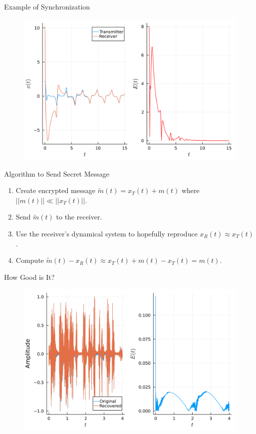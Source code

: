 \documentclass{beamer}
\begin{document}
\begin{frame}{Example of Synchronization}
    \begin{figure}[H]
        \includegraphics[width=\linewidth,height=\textheight,keepaspectratio]{combined_plot.png}
        \centering
    \end{figure}
\end{frame}


\begin{frame}{Algorithm to Send Secret Message}
    \begin{enumerate}[<+->]
        \item Create encrypted message $\widetilde{m}(t) = x_T (t) + m(t)$ where $||m(t)|| \ll ||x_T(t)||$. 
        \item Send $\widetilde{m}(t)$ to the receiver. 
        \item Use the receiver's dynamical system to hopefully reproduce $x_R(t) \approx x_T(t)$. 
        \item Compute $\widetilde{m}(t) - x_R(t) \approx x_T (t) + m(t) - x_T(t) = m(t)$. 
    \end{enumerate}
\end{frame}

\begin{frame}{How Good is It?}
    \begin{figure}[H]
        \includegraphics[width=\linewidth,height=\textheight,keepaspectratio]{combined_error_sound_plot.png}
        \centering
    \end{figure}
\end{frame}
\end{document}
